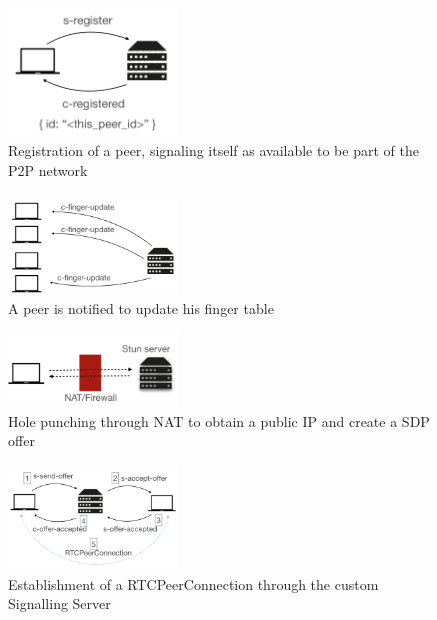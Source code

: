 \begin{figure}[h!]
  \centering
  \includegraphics[width=0.4\textwidth]{figs/1-peer-registers}
  \caption{Registration of a peer, signaling itself as available to be part of the P2P network}
  \label{fig:1-p-r}
\end{figure}

\begin{figure}[h!]
  \centering
  \includegraphics[width=0.4\textwidth]{figs/2-peers-notified}
  \caption{A peer is notified to update his finger table}
  \label{fig:2-p-n}
\end{figure}

\begin{figure}[h!]
  \centering
  \includegraphics[width=0.4\textwidth]{figs/3-peer-stun}
  \caption{Hole punching through NAT to obtain a public IP and create a SDP offer}
  \label{fig:3-p-s}
\end{figure}

\begin{figure}[h!]
  \centering
  \includegraphics[width=0.4\textwidth]{figs/4-peer-connect}
  \caption{Establishment of a RTCPeerConnection through the custom Signalling Server}
  \label{fig:4-p-c}
\end{figure}

